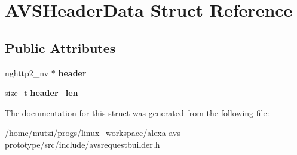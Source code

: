 \hypertarget{structAVSHeaderData}{}\section{A\+V\+S\+Header\+Data Struct Reference}
\label{structAVSHeaderData}
\subsection*{Public Attributes}
\begin{DoxyCompactItemize}
\item 
\mbox{\label{structAVSHeaderData_a6834b76cb79fd89038782a0b32d5a6a3}} 
nghttp2\+\_\+nv $\ast$ {\bfseries header}
\item 
\mbox{\label{structAVSHeaderData_abd96071f0a22c3e81f4c95c46af3f8cb}} 
size\+\_\+t {\bfseries header\+\_\+len}
\end{DoxyCompactItemize}


The documentation for this struct was generated from the following file\+:\begin{DoxyCompactItemize}
\item 
/home/mutzi/progs/linux\+\_\+workspace/alexa-\/avs-\/prototype/src/include/avsrequestbuilder.\+h\end{DoxyCompactItemize}
